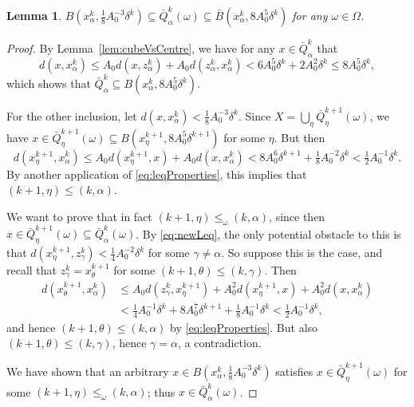 \documentclass{amsart}
\numberwithin{equation}{section}
\theoremstyle{plain}
\newtheorem{lemma}[equation]{Lemma}
\theoremstyle{definition}
\theoremstyle{remark}
\begin{document}
{{\begin{lemma}\label{lem:cubeVsBalls}
$B(x^k_{\alpha},\tfrac{1}{8}A_0^{-3}\delta^k)\subseteq\bar{Q}^k_{\alpha}(\omega)\subseteq\bar{B}(x^k_{\alpha},8A_0^5\delta^k)$ for any $\omega\in\Omega$.
\end{lemma}

\begin{proof}
By Lemma~\ref{lem:cubeVsCentre}, we have for any $x\in\bar{Q}^k_{\alpha}$ that
\begin{equation*}
  d(x,x^k_{\alpha})
  \leq A_0 d(x,z^k_{\alpha})+A_0 d(z^k_{\alpha},x^k_{\alpha})
  <6A_0^5\delta^k+2A_0^2\delta^k\leq 8A_0^5\delta^k,
\end{equation*}
which shows that $\bar{Q}^k_{\alpha}\subseteq B(x^k_{\alpha},8A_0^5\delta^k)$.

For the other inclusion, let $d(x,x^k_{\alpha})<\tfrac18 A_0^{-3}\delta^k$.
Since $X=\bigcup_{\eta}\bar{Q}^{k+1}_{\eta}(\omega)$, we have $x\in\bar{Q}^{k+1}_{\eta}(\omega)\subseteq B(x^{k+1}_{\eta},8A_0^5\delta^{k+1})$ for some $\eta$. But then
\begin{equation*}
  d(x^{k+1}_{\eta},x^k_{\alpha})
  \leq A_0 d(x^{k+1}_{\eta},x)+A_0 d(x,x^k_{\alpha})
  <8A_0^6\delta^{k+1}+\tfrac18A_0^{-2}\delta^k<\tfrac12A_0^{-1}\delta^k.  
\end{equation*}
By another application of \eqref{eq:leqProperties}, this implies that $(k+1,\eta)\leq(k,\alpha)$.

We want to prove that in fact $(k+1,\eta)\leq_{\omega}(k,\alpha)$, since then $x\in\bar{Q}^{k+1}_{\eta}(\omega)\subseteq\bar{Q}^k_{\alpha}(\omega)$. By \eqref{eq:newLeq}, the only potential obstacle to this is that $d(x^{k+1}_{\eta},z^k_{\gamma})<\tfrac14A_0^{-2}\delta^k$ for some $\gamma\neq\alpha$. So suppose this is the case, and recall that $z^k_{\gamma}=x^{k+1}_{\theta}$ for some $(k+1,\theta)\leq(k,\gamma)$. Then
\begin{equation*}
\begin{split}
  d(x^{k+1}_{\theta},x^k_{\alpha})
  &\leq A_0 d(z^k_{\gamma},x^{k+1}_{\eta})+A_0^2 d(x^{k+1}_{\eta},x)+A_0^2 d(x,x^k_{\alpha}) \\
  &<\tfrac14A_0^{-1}\delta^k+8A_0^7\delta^{k+1}+\tfrac{1}{8}A_0^{-1}\delta^k<\tfrac12A_0^{-1}\delta^k,
\end{split}
\end{equation*}
and hence $(k+1,\theta)\leq(k,\alpha)$ by \eqref{eq:leqProperties}. But also $(k+1,\theta)\leq(k,\gamma)$, hence $\gamma=\alpha$, a contradiction.

We have shown that an arbitrary $x\in B(x^k_{\alpha},\tfrac{1}{8}A_0^{-3}\delta^k)$ satisfies $x\in\bar{Q}^{k+1}_{\eta}(\omega)$ for some $(k+1,\eta)\leq_{\omega}(k,\alpha)$; thus $x\in\bar{Q}^k_{\alpha}(\omega)$.
\end{proof}

}}
\end{document}
